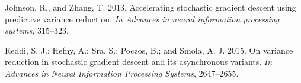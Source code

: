 \begin{thebibliography}{99}
 Johnson, R., and Zhang, T. 2013. Accelerating stochastic
gradient descent using predictive variance reduction. {\it In Advances in neural information processing systems}, 315--323.

Reddi, S. J.; Hefny, A.; Sra, S.; Poczos, B.; and Smola, A. J.
2015. On variance reduction in stochastic gradient descent
and its asynchronous variants. {\it In Advances in Neural Information Processing Systems}, 2647--2655.
\end{thebibliography}
